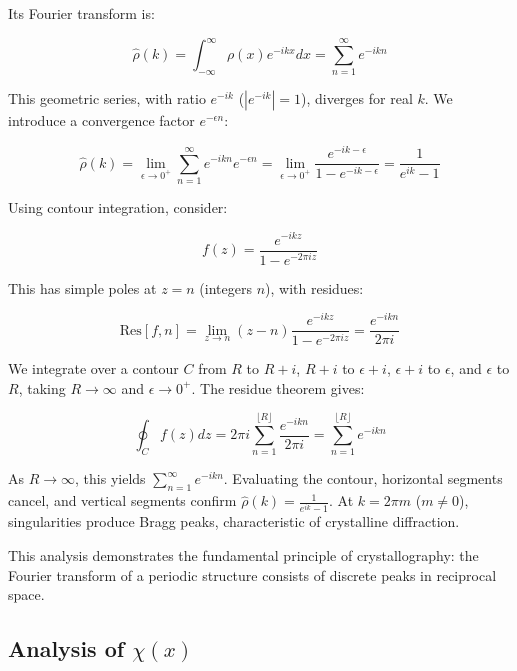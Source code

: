 \documentclass[11pt, oneside]{article}
\begin{document}
Its Fourier transform is:

\begin{equation}
\hat{\rho}(k) = \int_{-\infty}^{\infty} \rho(x) e^{-ikx} dx = \sum_{n=1}^{\infty} e^{-ikn}
\end{equation}

This geometric series, with ratio $e^{-ik}$ ($|e^{-ik}| = 1$), diverges for real $k$. We introduce a convergence factor $e^{-\epsilon n}$:

\begin{equation}
\hat{\rho}(k) = \lim_{\epsilon \to 0^+} \sum_{n=1}^{\infty} e^{-ikn} e^{-\epsilon n} = \lim_{\epsilon \to 0^+} \frac{e^{-ik-\epsilon}}{1 - e^{-ik-\epsilon}} = \frac{1}{e^{ik} - 1}
\end{equation}

Using contour integration, consider:

\begin{equation}
f(z) = \frac{e^{-ikz}}{1 - e^{-2\pi i z}}
\end{equation}

This has simple poles at $z = n$ (integers $n$), with residues:

\begin{equation}
\text{Res}[f, n] = \lim_{z \to n} (z - n) \frac{e^{-ikz}}{1 - e^{-2\pi i z}} = \frac{e^{-ikn}}{2\pi i}
\end{equation}

We integrate over a contour $C$ from $R$ to $R+i$, $R+i$ to $\epsilon+i$, $\epsilon+i$ to $\epsilon$, and $\epsilon$ to $R$, taking $R \to \infty$ and $\epsilon \to 0^+$. The residue theorem gives:

\begin{equation}
\oint_C f(z) dz = 2\pi i \sum_{n=1}^{\lfloor R \rfloor} \frac{e^{-ikn}}{2\pi i} = \sum_{n=1}^{\lfloor R \rfloor} e^{-ikn}
\end{equation}

As $R \to \infty$, this yields $\sum_{n=1}^{\infty} e^{-ikn}$. Evaluating the contour, horizontal segments cancel, and vertical segments confirm $\hat{\rho}(k) = \frac{1}{e^{ik} - 1}$. At $k = 2\pi m$ ($m \neq 0$), singularities produce Bragg peaks, characteristic of crystalline diffraction.

This analysis demonstrates the fundamental principle of crystallography: the Fourier transform of a periodic structure consists of discrete peaks in reciprocal space. 

\subsection{Analysis of $\chi(x)$}
\end{document}
